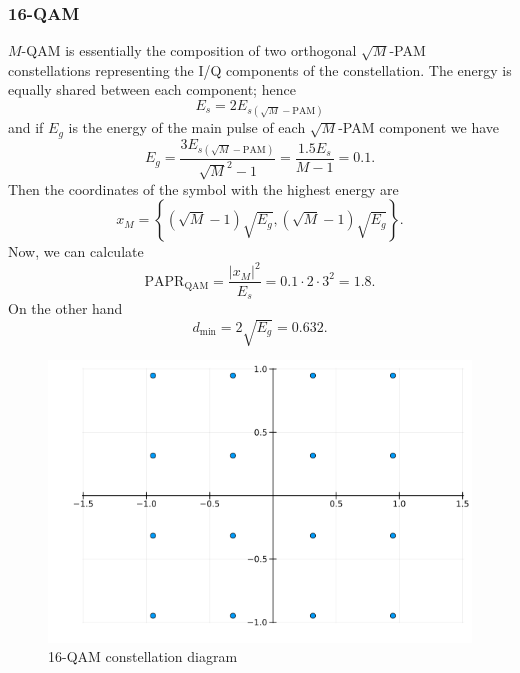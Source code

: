 \documentclass[11pt,a4paper,onecolumn,final]{article}
\begin{document}
\subsubsection*{16-QAM}
\(M\)-QAM is essentially the composition of two orthogonal \(\sqrt{M}\)-PAM constellations representing the I/Q components of the constellation. The energy is equally shared between each component; hence 
\begin{equation}
    E_s = 2E_{s\left(\sqrt{M}-\text{PAM}\right)}
\end{equation}
and if \(E_g\) is the energy of the main pulse of each \(\sqrt{M}\)-PAM component we have
\begin{equation}
    E_g = \dfrac{3E_{s\left(\sqrt{M}-\text{PAM}\right)}
}{\sqrt{M}^2 - 1} = \dfrac{1.5E_s }{M - 1} = 0.1.
\end{equation}
Then the coordinates of the symbol with the highest energy are 
\begin{equation}
    x_M = \left\{ \left(\sqrt{M} - 1\right)\sqrt{E_g}, \left(\sqrt{M} - 1\right)\sqrt{E_g} \right\}. 
\end{equation}
Now, we can calculate 
\begin{equation}
    \text{PAPR}_\text{QAM} = \frac{|x_M|^2 }{E_s } = 0.1\cdot 2 \cdot 3^2 = 1.8.
\end{equation}
On the other hand 
\begin{equation}
    d_\text{min} = 2\sqrt{E_g} = 0.632.
\end{equation}
\begin{figure}[h]
    \centering
    \includegraphics[scale=0.7]{16qam.png}
    \caption{16-QAM constellation diagram}
\end{figure}
\end{document}
